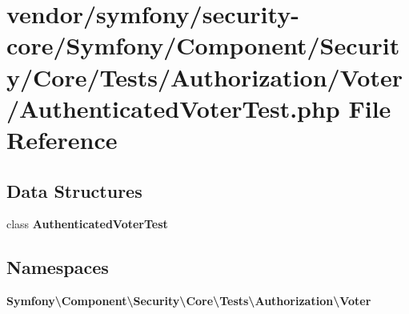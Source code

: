 \section{vendor/symfony/security-\/core/\+Symfony/\+Component/\+Security/\+Core/\+Tests/\+Authorization/\+Voter/\+Authenticated\+Voter\+Test.php File Reference}
\label{_authenticated_voter_test_8php}
\subsection*{Data Structures}
\begin{DoxyCompactItemize}
\item 
class {\bf Authenticated\+Voter\+Test}
\end{DoxyCompactItemize}
\subsection*{Namespaces}
\begin{DoxyCompactItemize}
\item 
 {\bf Symfony\textbackslash{}\+Component\textbackslash{}\+Security\textbackslash{}\+Core\textbackslash{}\+Tests\textbackslash{}\+Authorization\textbackslash{}\+Voter}
\end{DoxyCompactItemize}
